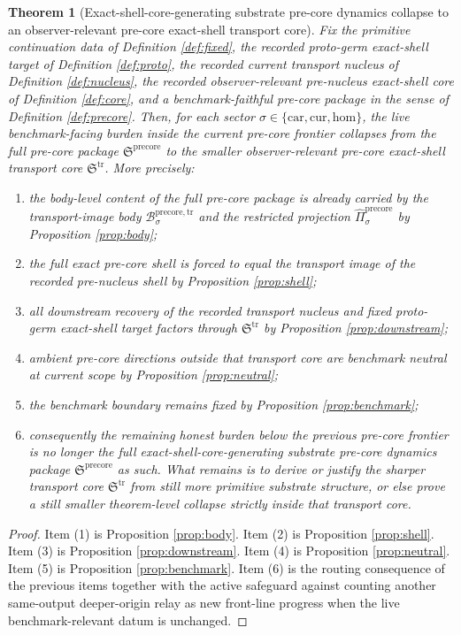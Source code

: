\documentclass[11pt]{article}
\newcommand{\Car}{\mathrm{car}}
\newcommand{\Cur}{\mathrm{cur}}
\newcommand{\Hom}{\mathrm{hom}}
\newcommand{\PreCorePackage}{\mathfrak S^{\mathrm{precore}}}
\newcommand{\PreCoreTransportCore}{\mathfrak S^{\mathrm{tr}}}
\newcommand{\PreCoreTrBody}[1]{\mathcal B_{#1}^{\mathrm{precore,tr}}}
\newcommand{\PreCoreTrProj}[1]{\widehat{\Pi}_{#1}^{\mathrm{precore}}}
\newtheorem{theorem}{Theorem}
\begin{document}
\begin{theorem}[Exact-shell-core-generating substrate pre-core dynamics collapse to an observer-relevant pre-core exact-shell transport core]
\label{thm:main}
Fix the primitive continuation data of Definition \ref{def:fixed}, the recorded proto-germ exact-shell target of Definition \ref{def:proto}, the recorded current transport nucleus of Definition \ref{def:nucleus}, the recorded observer-relevant pre-nucleus exact-shell core of Definition \ref{def:core}, and a benchmark-faithful pre-core package in the sense of Definition \ref{def:precore}. Then, for each sector \(\sigma\in\{\Car,\Cur,\Hom\}\), the live benchmark-facing burden inside the current pre-core frontier collapses from the full pre-core package \(\PreCorePackage\) to the smaller observer-relevant pre-core exact-shell transport core \(\PreCoreTransportCore\). More precisely:
\begin{enumerate}
    \item the body-level content of the full pre-core package is already carried by the transport-image body \(\PreCoreTrBody{\sigma}\) and the restricted projection \(\PreCoreTrProj{\sigma}\) by Proposition \ref{prop:body};
    \item the full exact pre-core shell is forced to equal the transport image of the recorded pre-nucleus shell by Proposition \ref{prop:shell};
    \item all downstream recovery of the recorded transport nucleus and fixed proto-germ exact-shell target factors through \(\PreCoreTransportCore\) by Proposition \ref{prop:downstream};
    \item ambient pre-core directions outside that transport core are benchmark neutral at current scope by Proposition \ref{prop:neutral};
    \item the benchmark boundary remains fixed by Proposition \ref{prop:benchmark};
    \item consequently the remaining honest burden below the previous pre-core frontier is no longer the full exact-shell-core-generating substrate pre-core dynamics package \(\PreCorePackage\) as such. What remains is to derive or justify the sharper transport core \(\PreCoreTransportCore\) from still more primitive substrate structure, or else prove a still smaller theorem-level collapse strictly inside that transport core.
\end{enumerate}
\end{theorem}

\begin{proof}
Item (1) is Proposition \ref{prop:body}. Item (2) is Proposition \ref{prop:shell}. Item (3) is Proposition \ref{prop:downstream}. Item (4) is Proposition \ref{prop:neutral}. Item (5) is Proposition \ref{prop:benchmark}. Item (6) is the routing consequence of the previous items together with the active safeguard against counting another same-output deeper-origin relay as new front-line progress when the live benchmark-relevant datum is unchanged.
\end{proof}
\end{document}
